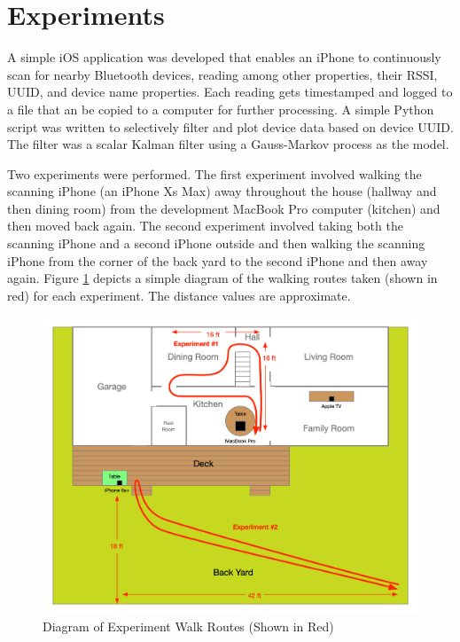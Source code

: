 \documentclass[12pt]{article}
\begin{document}
%
%

\clearpage
\section{Experiments}

A simple iOS application was developed that enables an iPhone to continuously scan for
nearby Bluetooth devices, reading among other properties, their RSSI, UUID, and device
name properties. Each reading gets timestamped and logged to a file that an be copied to
a computer for further processing. A simple Python script was written to selectively
filter and plot device data based on device UUID. The filter was a scalar Kalman filter
using a Gauss-Markov process as the model.

Two experiments were performed. The first experiment involved walking the scanning
iPhone (an iPhone Xs Max) away throughout the house (hallway and then dining room) from
the development MacBook Pro computer (kitchen) and then moved back again. The second
experiment involved taking both the scanning iPhone and a second iPhone outside and then
walking the scanning iPhone from the corner of the back yard to the second iPhone and then
away again. Figure \ref{fig:experiment-diagram} depicts a simple diagram of the walking
routes taken (shown in red) for each experiment. The distance values are approximate.

\begin{figure}[ht]
    \centering
    \includegraphics[width=1.0\textwidth]{RSSI-Experiment-Routes.png}
    \caption{Diagram of Experiment Walk Routes (Shown in Red)}
    \label{fig:experiment-diagram}
\end{figure}
\end{document}
